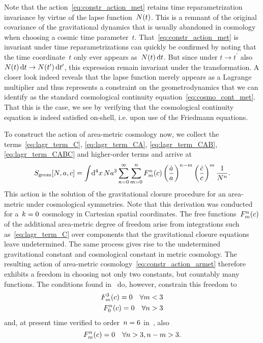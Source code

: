 Note that the action~\eqref{eq:constr_action_met} retains time reparametrization invariance by virtue of the lapse function~$N(t)$. This is a remnant of the original covariance of the gravitational dynamics that is usually abandoned in cosmology when choosing a cosmic time parameter~$t$. That~\eqref{eq:constr_action_met} is invariant under time reparametrizations can quickly be confirmed by noting that the time coordinate~$t$ only ever appears as~$\Nlapse\oft\dif{t}$. But since under $t\to t^\prime$ also $\Nlapse\oft\dif{t}\to\Nlapse\of{t^\prime}\dif{t^\prime}$, this expression remain invariant under the transformation. A closer look indeed reveals that the lapse function merely appears as a Lagrange multiplier and thus represents a constraint on the geometrodynamics that we can identify as the standard cosmological continuity equation~\eqref{eq:cosmo_cont_met}. That this is the case, we see by verifying that the cosmological continuity equation is indeed satisfied on-shell, i.e. upon use of the Friedmann equations.


To construct the action of area-metric cosmology now, we collect the terms~\eqref{eq:lagr_term_C}, \eqref{eq:lagr_term_CA}, \eqref{eq:lagr_term_CAB}, \eqref{eq:lagr_term_CABC} and higher-order terms and arrive at
\begin{equation}\label{eq:constr_action_armet}
	\actgeom[\Nlapse,\scalea,\scalec]=\intd{^4\coordx}\Nlapse\scalea^3\sum_{\Nind=0}^{\infty}\sum_{\nind=0}^{\Nind}\Func{\Nind}{\nind}\ofc\left(\lndt{\scalea}\right)^{\Nind-\nind}\left(\lndt{\scalec}\right)^{\nind}\frac{1}{\Nlapse^{\Nind}}
	\eqpunct{.}
\end{equation}
This action is the solution of the gravitational closure procedure for an area-metric under cosmological symmetries. Note that this derivation was conducted for a~${k=0}$ cosmology in Cartesian spatial coordinates. The free functions~${F^{n}_{m}}(c)$ of the additional area-metric degree of freedom arise from integrations such as~\eqref{eq:lagr_term_C} over components that the gravitational closure equations leave undetermined. The same process gives rise to the undetermined gravitational constant and cosmological constant in metric cosmology. The resulting action of area-metric cosmology~\eqref{eq:constr_action_armet} therefore exhibits a freedom in choosing not only two constants, but countably many functions. The conditions found in~\autocite{DuellPhd} do, however, constrain this freedom to
\begin{align}
	{F^{3}_{m}}(c)=0\quad\forall m<3\\
	{F^{n}_{0}}(c)=0\quad\forall n>3
\end{align}
and, at present time verified to order~$n=6$ in~\autocite{DuellPhd}, also
\begin{equation}
	{F^{n}_{m}}(c)=0\quad\forall n>3\mathpunct{,}n-m>3
	\mathpunct{.}
\end{equation}

